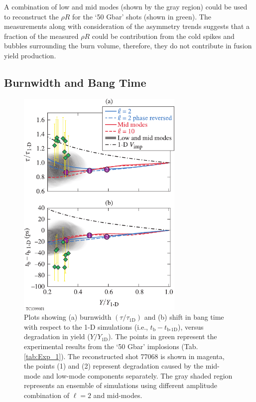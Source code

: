 \documentclass[aip,reprint]{revtex4-1}
\begin{document}
  A combination of low and mid modes (shown by the gray region) could be used to reconstruct the $\rho R$ for the `50 Gbar' shots (shown in green). The measurements along with consideration of the asymmetry trends suggests that a fraction of the measured $\rho R$ could be contribution from the cold spikes and bubbles surrounding the burn volume, therefore, they do not contribute in fusion yield production.
%
%
%
%
%
\subsection{Burnwidth and Bang Time}
\label{sec:Exp_bwandbt}
%
%
%
%
%
\begin{figure}
\includegraphics[width=80mm]{Fig15_Bose}
\caption{\label{fig:Exp_BW_BT}\small{Plots showing (a) burnwidth $( \tau/\tau_\text{1D} )$ and (b) shift in bang time with respect to the 1-D simulations (i.e., $t_\text{b}-t_\text{b-1D}$), versus degradation in yield ($Y/Y_\text{1D}$). The points in green represent the experimental results from the `50 Gbar' implosions (Tab. \ref{tab:Exp_1}). The reconstructed shot 77068 is shown in magenta, the points (1) and (2) represent degradation caused by the mid-mode and low-mode components separately. The gray shaded region represents an ensemble of simulations using different amplitude combination of $\ell=2$ and mid-modes.}}
\end{figure}
%
\end{document}
